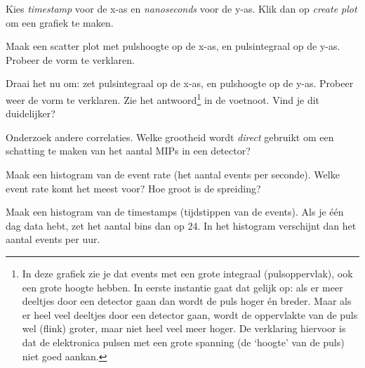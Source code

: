 \begin{questions}
\question Kies \emph{timestamp} voor de x-as en \emph{nanoseconds} voor
de y-as. Klik dan op \emph{create plot} om een grafiek te maken.


\question Maak een scatter plot met pulshoogte op de x-as, en
pulsintegraal op de y-as. Probeer de vorm te verklaren.

\question Draai het nu om: zet pulsintegraal op de x-as, en pulshoogte op
de y-as. Probeer weer de vorm te verklaren. Zie het antwoord\footnote{In
deze grafiek zie je dat events met een grote integraal (pulsoppervlak),
ook een grote hoogte hebben. In eerste instantie gaat dat gelijk op: als
er meer deeltjes door een detector gaan dan wordt de puls hoger én breder.
Maar als er heel veel deeltjes door een detector gaan, wordt de
oppervlakte van de puls wel (flink) groter, maar niet heel veel meer
hoger. De verklaring hiervoor is dat de elektronica pulsen met een grote
spanning (de `hoogte' van de puls) niet goed aankan.} in de voetnoot. Vind
je dit duidelijker?

\question Onderzoek andere correlaties. Welke grootheid wordt
\emph{direct} gebruikt om een schatting te maken van het aantal MIPs in
een detector?





\question Maak een histogram van de event rate (het aantal events per
seconde).  Welke event rate komt het meest voor? Hoe groot is de
spreiding?

\question Maak een histogram van de timestamps (tijdstippen van de
events). Als je één dag data hebt, zet het aantal bins dan op 24. In het
histogram verschijnt dan het aantal events per uur.


\end{questions}
